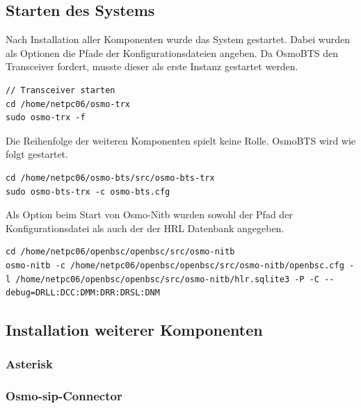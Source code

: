 \subsection{Starten des Systems}
Nach Installation aller Komponenten wurde das System gestartet. Dabei wurden als Optionen die Pfade der Konfigurationsdateien angeben. Da OsmoBTS den Transceiver fordert, musste dieser als erste Instanz gestartet werden. 

\begin{lstlisting}
// Transceiver starten
cd /home/netpc06/osmo-trx
sudo osmo-trx -f
\end{lstlisting}

Die Reihenfolge der weiteren Komponenten spielt keine Rolle. OsmoBTS wird wie folgt gestartet.

\begin{lstlisting}
cd /home/netpc06/osmo-bts/src/osmo-bts-trx
sudo osmo-bts-trx -c osmo-bts.cfg
\end{lstlisting}

Als Option beim Start von Osmo-Nitb wurden sowohl der Pfad der Konfigurationsdatei als auch der der HRL Datenbank angegeben.
\begin{lstlisting}
cd /home/netpc06/openbsc/openbsc/src/osmo-nitb
osmo-nitb -c /home/netpc06/openbsc/openbsc/src/osmo-nitb/openbsc.cfg -l /home/netpc06/openbsc/openbsc/src/osmo-nitb/hlr.sqlite3 -P -C --debug=DRLL:DCC:DMM:DRR:DRSL:DNM
\end{lstlisting}

\subsection{Installation weiterer Komponenten}

\subsubsection{Asterisk}
\subsubsection{Osmo-sip-Connector}